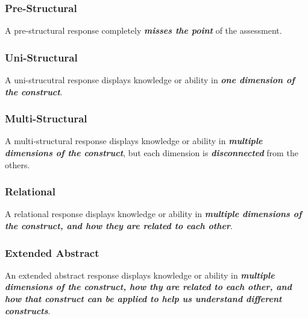 \documentclass[
]{book}
\begin{document}
\hypertarget{pre-structural}{%
\subsubsection*{Pre-Structural}\label{pre-structural}}

A pre-structural response completely \textbf{\emph{misses the point}} of the assessment.

\hypertarget{uni-structural}{%
\subsubsection*{Uni-Structural}\label{uni-structural}}

A uni-strucutral response displays knowledge or ability in \textbf{\emph{one dimension of the construct}}.

\hypertarget{multi-structural}{%
\subsubsection*{Multi-Structural}\label{multi-structural}}

A multi-structural response displays knowledge or ability in \textbf{\emph{multiple dimensions of the construct}}, but each dimension is \textbf{\emph{disconnected}} from the others.

\hypertarget{relational}{%
\subsubsection*{Relational}\label{relational}}

A relational response displays knowledge or ability in \textbf{\emph{multiple dimensions of the construct, and how they are related to each other}}.

\hypertarget{extended-abstract}{%
\subsubsection*{Extended Abstract}\label{extended-abstract}}

An extended abstract response displays knowledge or ability in \textbf{\emph{multiple dimensions of the construct, how thy are related to each other, and how that construct can be applied to help us understand different constructs}}.
\end{document}
